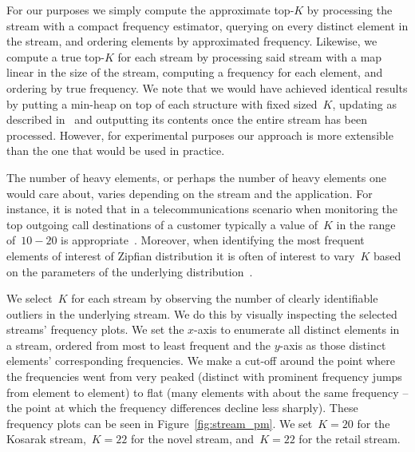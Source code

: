 
For our purposes we simply compute the approximate top-$K$ by processing the stream with a compact frequency estimator, querying on every distinct element in the stream, and ordering elements by approximated frequency. Likewise, we compute a true top-$K$ for each stream by processing said stream with a map linear in the size of the stream, computing a frequency for each element, and ordering by true frequency.  We note that we would have achieved identical results by putting a min-heap on top of each structure with fixed sized~$K$, updating as described in~\cite{yang2019heavykeeper} and outputting its contents once the entire stream has been processed. However, for experimental purposes our approach is more extensible than the one that would be used in practice.


The number of heavy elements, or perhaps the number of heavy elements one would care about, varies depending on the stream and the application. For instance, it is noted that in a telecommunications scenario when monitoring the top outgoing call destinations of a customer typically a value of~$K$ in the range of~$10-20$ is appropriate~\cite{homen2010}. Moreover, when identifying the most frequent elements of interest of Zipfian distribution it is often of interest to vary~$K$ based on the parameters of the underlying distribution~\cite{charikar2002finding}.

We select~$K$ for each stream by observing the number of clearly identifiable outliers in the underlying stream.  We do this by visually inspecting the selected streams' frequency plots. We set the $x$-axis to enumerate all distinct elements in a stream, ordered from  most to least frequent and the $y$-axis as those distinct elements' corresponding frequencies. We make a cut-off around the point where the frequencies went from very peaked (distinct with prominent frequency jumps from element to element) to flat (many elements with about the same frequency -- the point at which the frequency differences decline less sharply). These frequency plots can be seen in Figure~\ref{fig:stream_pm}. We set~$K=20$ for the Kosarak stream,~$K=22$ for the novel stream, and~$K=22$ for the retail stream. 

